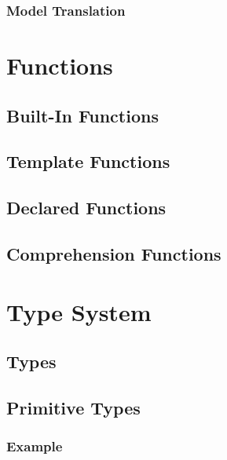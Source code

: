 \documentclass[a4paper,oneside,12pt, extrafontsizes]{memoir}
\begin{document}
    \section{Model Translation}

\part{Functions}

  \chapter{Built-In Functions}
  \label{ch:built-in-functions}
  

  \chapter{Template Functions}
  \label{ch:template-functions}
  

  \chapter{Declared Functions}
  \label{ch:declared-functions}
  

  \chapter{Comprehension Functions}
  \label{ch:comprehension-functions}
  

\part{Type System}

  \chapter{Types}
  \label{ch:types}
  

  \chapter{Primitive Types}
  \label{ch:primitive-types}
  

    \section{Example}
    
\end{document}
